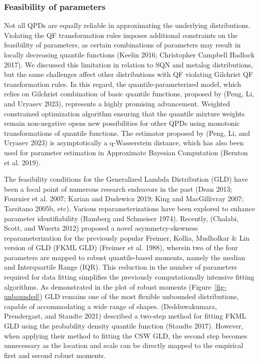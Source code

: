 \documentclass[
]{interact}
\begin{document}
\subsubsection*{Feasibility of
parameters}\label{feasibility-of-parameters}

Not all QPDs are equally reliable in approximating the underlying
distributions. Violating the QF transformation rules imposes additional
constraints on the feasibility of parameters, as certain combinations of
parameters may result in locally decreasing quantile functions (Keelin
2016; Christopher Campbell Hadlock 2017). We discussed this limitation
in relation to SQN and metalog distributions, but the same challenges
affect other distributions with QF violating Gilchrist QF transformation
rules. In this regard, the quantile-parameterized model, which relies on
Gilchrist combination of basic quantile functions, proposed by (Peng,
Li, and Uryasev 2023), represents a highly promising advancement.
Weighted constrained optimization algorithm ensuring that the quantile
mixture weights remain non-negative opens new possibilities for other
QPDs using monotonic transformations of quantile functions. The
estimator proposed by (Peng, Li, and Uryasev 2023) is asymptotically a
q-Wasserstein distance, which has also been used for parameter
estimation in Approximate Bayesian Computation (Bernton et al. 2019).

The feasibility conditions for the Generalized Lambda Distribution (GLD)
have been a focal point of numerous research endeavors in the past (Dean
2013; Fournier et al. 2007; Karian and Dudewicz 2019; King and
MacGillivray 2007; Tarsitano 2005b, etc). Various reparameterizations
have been explored to enhance parameter identifiability (Ramberg and
Schmeiser 1974). Recently, (Chalabi, Scott, and Wuertz 2012) proposed a
novel asymmetry-skewness reparameterization for the previously popular
Freimer, Kollia, Mudholkar \& Lin version of GLD (FKML GLD) (Freimer et
al. 1988), wherein two of the four parameters are mapped to robust
quantile-based moments, namely the median and Interquartile Range (IQR).
This reduction in the number of parameters required for data fitting
simplifies the previously computationally intensive fitting algorithms.
As demonstrated in the plot of robust moments
(Figure~\ref{fig-unbounded}) GLD remains one of the most flexible
unbounded distributions, capable of accommodating a wide range of
shapes. (Dedduwakumara, Prendergast, and Staudte 2021) described a
two-step method for fitting FKML GLD using the probability density
quantile function (Staudte 2017). However, when applying their method to
fitting the CSW GLD, the second step becomes unnecessary as the location
and scale can be directly mapped to the empirical first and second
robust moments.
\end{document}
